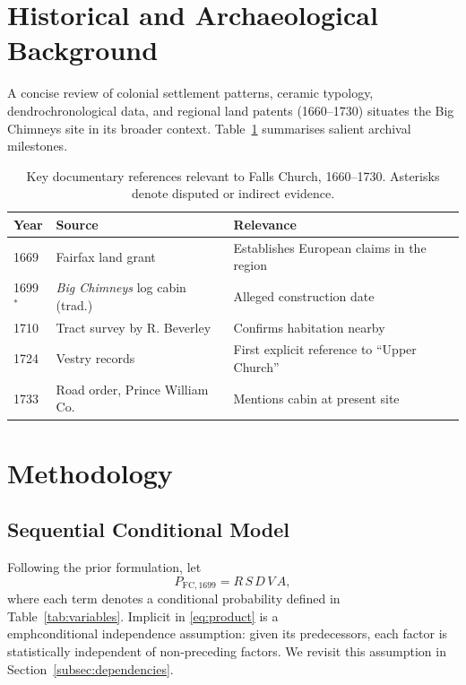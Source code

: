 \documentclass[11pt]{article}
\begin{document}
\section{Historical and Archaeological Background}
\label{sec:background}
A concise review of colonial settlement patterns, ceramic typology, dendrochronological data, and regional land patents (1660–1730) situates the Big Chimneys site in its broader context. Table~\ref{tab:chronology} summarises salient archival milestones.

\begin{table}[ht]
  \centering
  \caption{Key documentary references relevant to Falls Church, 1660–1730. Asterisks denote disputed or indirect evidence.}
  \label{tab:chronology}
  \begin{tabular}{@{}lll@{}}
    \toprule
    Year & Source & Relevance\\
    \midrule
    1669 & Fairfax land grant & Establishes European claims in the region\\
    1699$^{*}$ & \textit{Big Chimneys} log cabin (trad.) & Alleged construction date\\
    1710 & Tract survey by R. Beverley & Confirms habitation nearby\\
    1724 & Vestry records & First explicit reference to ``Upper Church''\\
    1733 & Road order, Prince William Co. & Mentions cabin at present site\\
    \bottomrule
  \end{tabular}
\end{table}

\section{Methodology}
\subsection{Sequential Conditional Model}
Following the prior formulation, let
\begin{equation}
  P_{\mathrm{FC},1699} = R\,S\,D\,V\,A, \label{eq:product}
\end{equation}
where each term denotes a conditional probability defined in Table~\ref{tab:variables}. Implicit in \eqref{eq:product} is a \\emph{conditional independence} assumption: given its predecessors, each factor is statistically independent of non‐preceding factors. We revisit this assumption in Section~\ref{subsec:dependencies}.
\end{document}
